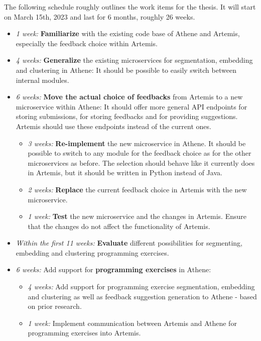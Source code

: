 The following schedule roughly outlines the work items for the thesis. It will start on March 15th, 2023 and last for 6 months, roughly 26 weeks.

\begin{itemize}
    \item \textit{1 week:} \textbf{Familiarize} with the existing code base of Athene and Artemis, especially the feedback choice within Artemis.
    \item \textit{4 weeks:} \textbf{Generalize} the existing microservices for segmentation, embedding and clustering in Athene: It should be possible to easily switch between internal modules.
    \item \textit{6 weeks:} \textbf{Move the actual choice of feedbacks} from Artemis to a new microservice within Athene: It should offer more general API endpoints for storing submissions, for storing feedbacks and for providing suggestions. Artemis should use these endpoints instead of the current ones.
    \begin{itemize}
        \item \textit{3 weeks:} \textbf{Re-implement} the new microservice in Athene. It should be possible to switch to any module for the feedback choice as for the other microservices as before. The selection should behave like it currently does in Artemis, but it should be written in Python instead of Java.
        \item \textit{2 weeks:} \textbf{Replace} the current feedback choice in Artemis with the new microservice.
        \item \textit{1 week:} \textbf{Test} the new microservice and the changes in Artemis. Ensure that the changes do not affect the functionality of Artemis.
    \end{itemize}
    \item \textit{Within the first 11 weeks:} \textbf{Evaluate} different possibilities for segmenting, embedding and clustering programming exercises. %
    \item \textit{6 weeks:} Add support for \textbf{programming exercises} in Athene:
    \begin{itemize}
        \item \textit{4 weeks:} Add support for programming exercise segmentation, embedding and clustering as well as feedback suggestion generation to Athene - based on prior research.
        \item \textit{1 week:} Implement communication between Artemis and Athene for programming exercises into Artemis.

\end{itemize}
\end{itemize}
